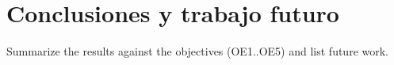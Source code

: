 
\section{Conclusiones y trabajo futuro}

Summarize the results against the objectives (OE1..OE5) and list future work.
